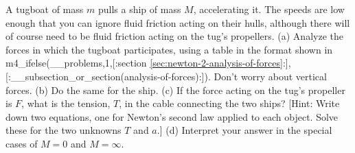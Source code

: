 A tugboat of mass $m$ pulls a ship of mass $M$,
accelerating it. The speeds are low enough that you can
ignore fluid friction acting on their hulls, although there
will of course need to be fluid friction acting on
the tug's propellers.\hwendpart
(a) Analyze the forces in which the tugboat participates,
using a table in the format shown in m4_ifelse(__problems,1,[:section \ref{sec:newton-2-analysis-of-forces}:],[:__subsection_or_section(analysis-of-forces):]). Don't
worry about vertical forces.\hwendpart
(b) Do the same for the ship.\hwendpart
(c) If the force acting on the tug's
propeller is $F$, what is the tension, $T$, in the cable
connecting the two ships? [Hint: Write down two equations,
one for Newton's second law applied to each object. Solve
these for the two unknowns $T$ and $a$.]\answercheck\hwendpart
(d) Interpret your answer in the special cases of $M=0$ and $M=\infty$.
